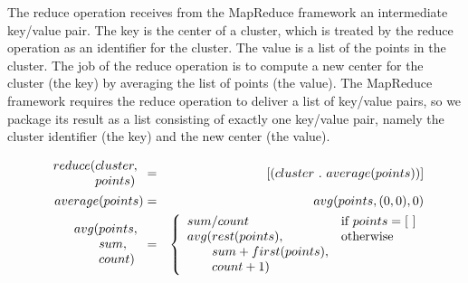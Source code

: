 The reduce operation receives from the MapReduce framework 
an intermediate key/value pair.
The key is the center of a cluster, which is treated by the reduce operation
as an identifier for the cluster.
The value is a list of the points in the cluster. 
The job of the reduce operation is to compute a new
center for the cluster (the key) by averaging the list of points (the value).
The MapReduce framework requires the reduce operation to deliver
a list of key/value pairs, so we package its result as a list consisting
of exactly one key/value pair, namely the cluster identifier (the key) and the 
new center (the value).



\begin{eqnarray*}
    \begin{array}{l@{}l}
        reduce(&cluster, \\
               &points)
    \end{array} &=& [ ( cluster ~.~ average(points) ) ] \\
average(points) &=& avg(points, (0,0), 0) \\
\begin{array}{l@{}l}
    avg(&points, \\
        &sum, \\
        &count)
\end{array} &=&
    \left\{
        \begin{array}{l@{}ll}
            \multicolumn{2}{l}{sum / count} & \mbox{if } points = [~] \\
            avg(& rest(points),             & \mbox{otherwise} \\
                & sum+first(points),        & \\
                & count+1)                  & \\
        \end{array}
    \right.
\end{eqnarray*}

